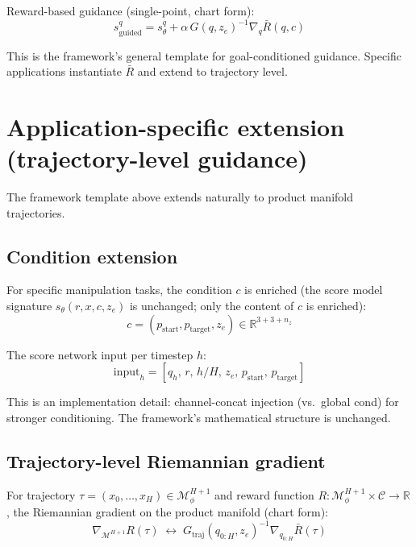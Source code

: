 \documentclass[11pt,a4paper]{article}
\newcommand{\R}{\mathbb{R}}
\newcommand{\Mphi}{\mathcal{M}_{\phi}}
\newcommand{\Mset}{\mathcal{M}}
\begin{document}
Reward-based guidance (single-point, chart form):
\begin{equation}
s_{\text{guided}}^q = s_\theta^q + \alpha \, G(q, z_e)^{-1} \nabla_q \bar{R}(q, c)
\end{equation}

This is the framework's general template for goal-conditioned guidance. Specific applications instantiate $\bar R$ and extend to trajectory level.

\section{Application-specific extension (trajectory-level guidance)}

The framework template above extends naturally to product manifold trajectories.

\subsection{Condition extension}

For specific manipulation tasks, the condition $c$ is enriched (the score model signature $s_\theta(r, x, c, z_e)$ is unchanged; only the content of $c$ is enriched):
\begin{equation}
c = (p_{\text{start}}, p_{\text{target}}, z_e) \in \R^{3 + 3 + n_z}
\end{equation}

The score network input per timestep $h$:
\begin{equation}
\text{input}_h = [q_h, \, r, \, h/H, \, z_e, \, p_{\text{start}}, \, p_{\text{target}}]
\end{equation}

This is an implementation detail: channel-concat injection (vs.\ global cond) for stronger conditioning. The framework's mathematical structure is unchanged.

\subsection{Trajectory-level Riemannian gradient}

For trajectory $\tau = (x_0, \ldots, x_H) \in \Mphi^{H+1}$ and reward function $R: \Mphi^{H+1} \times \mathcal{C} \to \R$, the Riemannian gradient on the product manifold (chart form):
\begin{equation}
\nabla_{\Mset^{H+1}} R(\tau) \;\leftrightarrow\; G_{\text{traj}}(q_{0:H}, z_e)^{-1} \nabla_{q_{0:H}} \bar{R}(\tau)
\end{equation}
\end{document}
